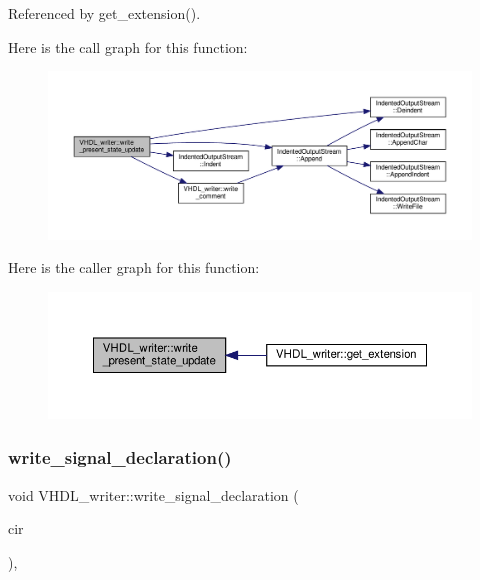 Referenced by get\+\_\+extension().

Here is the call graph for this function\+:
\nopagebreak
\begin{figure}[H]
\begin{center}
\leavevmode
\includegraphics[width=350pt]{d0/d0c/structVHDL__writer_a24689039313dfd370692b4c13f2c8862_cgraph}
\end{center}
\end{figure}
Here is the caller graph for this function\+:
\nopagebreak
\begin{figure}[H]
\begin{center}
\leavevmode
\includegraphics[width=350pt]{d0/d0c/structVHDL__writer_a24689039313dfd370692b4c13f2c8862_icgraph}
\end{center}
\end{figure}
\mbox{\label{structVHDL__writer_abbe0d08a850b90049d20cbc3ded0e132}} 
\subsubsection{\texorpdfstring{write\+\_\+signal\+\_\+declaration()}{write\_signal\_declaration()}}
{\footnotesize\ttfamily void V\+H\+D\+L\+\_\+writer\+::write\+\_\+signal\+\_\+declaration (\begin{DoxyParamCaption}\item[{const \hyperlink{structural__objects_8hpp_a8ea5f8cc50ab8f4c31e2751074ff60b2}{structural\+\_\+object\+Ref} \&}]{cir }\end{DoxyParamCaption})\hspace{0.3cm}{\ttfamily [override]}, {\ttfamily [virtual]}}



